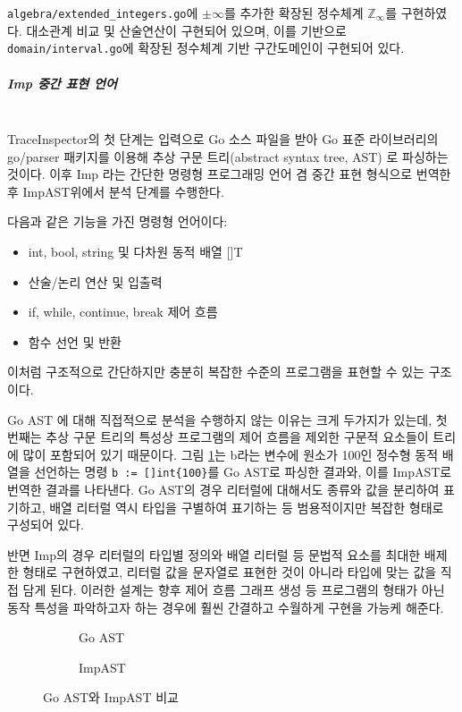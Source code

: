 \documentclass[a4paper,12pt]{article}
\newcommand{\imp}{\textsf{Imp}}
\newcommand{\traceinspector}{\textsf{TraceInspector}}
\begin{document}
 \verb|algebra/extended_integers.go|에 $\pm \infty$를 추가한 확장된 정수체계 $\mathbb{Z}_{\infty}$를 구현하였다.
대소관계 비교 및 산술연산이 구현되어 있으며, 이를 기반으로 \verb|domain/interval.go|에 확장된 정수체계 기반 구간도메인이 구현되어 있다.

\subparagraph{\textsf{Imp} 중간 표현 언어} ~\\

\traceinspector 의 첫 단계는 입력으로 Go 소스 파일을 받아 Go 표준 라이브러리의 \textsf{go/parser} 패키지를 이용해 추상 구문 트리(abstract syntax tree, AST)
로 파싱하는 것이다. 이후 \imp \cite{pierce2002} 라는 간단한 명령형 프로그래밍 언어 겸 중간 표현 형식으로 번역한 후 \imp AST위에서 분석 단계를 수행한다.

 다음과 같은 기능을 가진 명령형 언어이다:
\begin{itemize}
    \item \textsf{int, bool, string} 및 다차원 동적 배열 \textsf{[]T}
    \item 산술/논리 연산 및 입출력
    \item \textsf{if, while, continue, break} 제어 흐름
    \item 함수 선언 및 반환
\end{itemize}
이처럼 구조적으로 간단하지만 충분히 복잡한 수준의 프로그램을 표현할 수 있는 구조이다. 

Go AST 에 대해 직접적으로 분석을 수행하지 않는 이유는 크게 두가지가 있는데, 첫번째는 추상 구문 트리의 특성상 프로그램의 제어 흐름을 제외한 구문적 요소들이 트리에 많이 포함되어 있기 때문이다.
그림 \ref{fig:go_imp_ast}는 b라는 변수에 원소가 100인 정수형 동적 배열을 선언하는 명령 \verb|b := []int{100}|를 Go AST로 파싱한 결과와, 이를 \imp AST로 번역한 결과를 나타낸다.
Go AST의 경우 리터럴에 대해서도 종류와 값을 분리하여 표기하고, 배열 리터럴 역시 타입을 구별하여 표기하는 등 범용적이지만 복잡한 형태로 구성되어 있다.

반면 \imp 의 경우 리터럴의 타입별 정의와 배열 리터럴 등 문법적 요소를 최대한 배제한 형태로 구현하였고, 리터럴 값을 문자열로 표현한 것이 아니라 타입에 맞는 값을 직접 담게 된다. 이러한 설계는 
향후 제어 흐름 그래프 생성 등 프로그램의 형태가 아닌 동작 특성을 파악하고자 하는 경우에 훨씬 간결하고 수월하게 구현을 가능케 해준다.

\begin{figure}[t]
    \centering

    \begin{subfigure}[t]{0.48\textwidth}
        \centering
        
        \caption{Go AST}
    \end{subfigure}
    \hfill
    \begin{subfigure}[t]{0.48\textwidth}
        \centering
        
        \caption{\imp AST}
    \end{subfigure}

    \caption{Go AST와 \imp AST 비교}
    \label{fig:go_imp_ast}
\end{figure}
\end{document}
